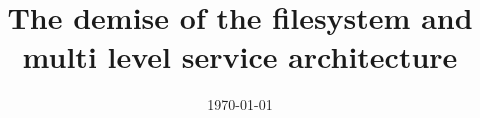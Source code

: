 \documentclass[modern]{aastex62}
\begin{document}

\date{\today}


\title{The demise of the filesystem and multi level service  architecture}







\end{document}
